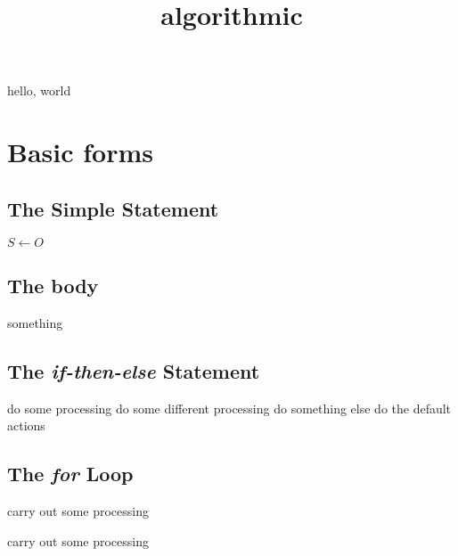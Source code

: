 \documentclass{amsart}
\title{algorithmic}
\begin{document}
\maketitle

hello, world


\section{Basic forms}

\subsection{The Simple Statement}

\begin{algorithmic}[1]
\STATE $S \leftarrow O$
\end{algorithmic}

\subsection{The body}

\begin{algorithmic}[1]
\BODY
    \STATE something
\ENDBODY
\end{algorithmic}

\subsection{The \emph{if-then-else} Statement}


\begin{algorithmic}[3]
    \STATE do some processing
    \STATE do some different processing
    \STATE do something else
\ELSE
    \STATE do the default actions
\ENDIF
\end{algorithmic}

\subsection{The \emph{for} Loop}

\begin{algorithmic}[1]
    \STATE carry out some processing 
\ENDFOR
\end{algorithmic}

\begin{algorithmic}[1]
    \STATE carry out some processing 
\ENDFOR
\end{algorithmic}
\end{document}
